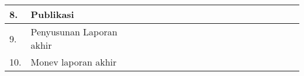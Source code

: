 \documentclass[../graphandtab.tex]{subfiles}
\begin{document}
\begin{table}[!ht]
\begin{tabular}{|p{1.5em}|p{9em}|l|l|l|l|l|l|l|l|l|l|l|l|}
		8.                            &  Publikasi                                 &  ~                                        &  ~           &  ~           &  ~                    &  ~                    &  ~                    &  ~                    &  ~                    &  ~                    &  \cellcolor{blue!25}  &  ~                    &  ~  \\ \hline
		9.                            &  Penyusunan Laporan akhir                  &  ~                                        &  ~           &  ~           &  ~                    &  ~                    &  ~                    &  ~                    &  ~                    &  ~                    &  ~                    &  \cellcolor{blue!25}  &  ~  \\ \hline
		10.                           &  Monev laporan akhir                       &  ~                                        &  ~           &  ~           &  ~                    &  ~                    &  ~                    &  ~                    &  ~                    &  ~                    &  ~                    &  ~                    &  \cellcolor{blue!25}  \\ \hline
	\end{tabular}
\end{table}





% 
\end{document}
